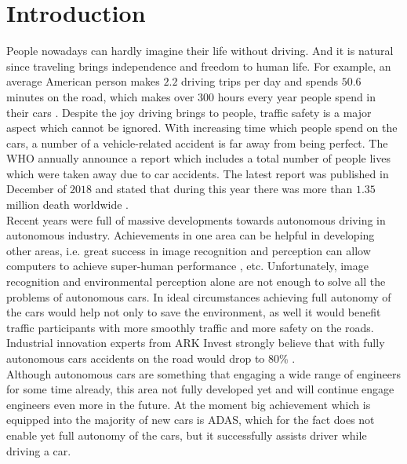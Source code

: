 
\chapter{Introduction}
\label{chap:0}

People nowadays can hardly imagine their life without driving. And it is natural since traveling brings independence and freedom to human life. For example, an average American person makes $2.2$ driving trips per day and spends $50.6$ minutes on the road, which makes over $300$ hours every year people spend in their cars \cite{americanDriving}. Despite the joy driving brings to people, traffic safety is a major aspect which cannot be ignored. With increasing time which people spend on the cars, a number of a vehicle-related accident is far away from being perfect. The \gls{WHO} annually announce a report which includes a total number of people lives which were taken away due to car accidents. The latest report was published in December of $2018$ and stated that during this year there was more than $1.35$ million death worldwide \cite{WHOstatistics}. \\
Recent years were full of massive developments towards autonomous driving in autonomous industry. Achievements in one area can be helpful in developing other areas, i.e. great success in image recognition and perception can allow computers to achieve super-human performance \cite{SuperComputer}, etc. Unfortunately, image recognition and environmental perception alone are not enough to solve all the problems of autonomous cars. In ideal circumstances achieving full autonomy of the cars would help not only to save the environment, as well it would benefit traffic participants with more smoothly traffic and more safety on the roads. Industrial innovation experts from ARK Invest strongly believe that with fully autonomous cars accidents on the road would drop to $80$\% \cite{ARKInvest}.\\
Although autonomous cars are something that engaging a wide range of engineers for some time already, this area not fully developed yet and will continue engage engineers even more in the future. At the moment big achievement which is equipped into the majority of new cars is \gls{ADAS}, which for the fact does not enable yet full autonomy of the cars, but it successfully assists driver while driving a car.\\
